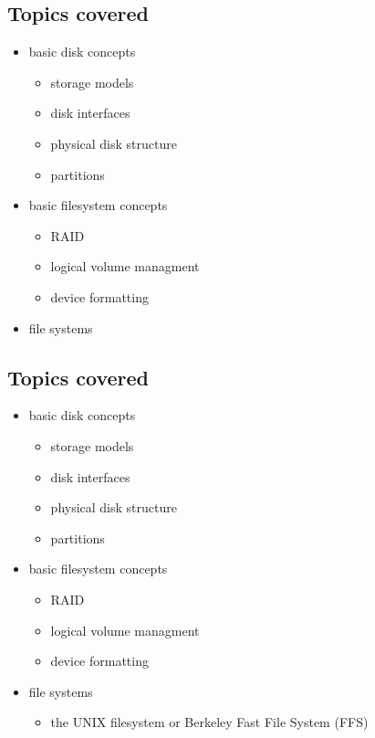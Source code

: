 \documentclass[xga]{xdvislides}
\begin{document}
\subsection{Topics covered}
\begin{itemize}
	\item basic disk concepts
		\begin{itemize}
			\item storage models
			\item disk interfaces
			\item physical disk structure
			\item partitions
		\end{itemize}
	\item basic filesystem concepts
		\begin{itemize}
			\item RAID
			\item logical volume managment
			\item device formatting
		\end{itemize}
	\item file systems
\end{itemize}

\subsection{Topics covered}
\begin{itemize}
	\item basic disk concepts
		\begin{itemize}
			\item storage models
			\item disk interfaces
			\item physical disk structure
			\item partitions
		\end{itemize}
	\item basic filesystem concepts
		\begin{itemize}
			\item RAID
			\item logical volume managment
			\item device formatting
		\end{itemize}
	\item file systems
		\begin{itemize}
			\item the UNIX filesystem or Berkeley Fast File System (FFS)
		\end{itemize}
\end{itemize}
\end{document}
